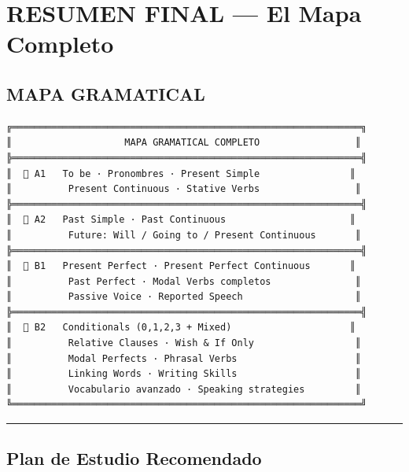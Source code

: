 \documentclass[
  spanish,
  letterpaper,
]{scrbook}
\begin{document}

\chapter{RESUMEN FINAL --- El Mapa
Completo}\label{resumen-final-el-mapa-completo}

\section{MAPA GRAMATICAL}\label{mapa-gramatical}

\begin{verbatim}
╔══════════════════════════════════════════════════════════════╗
║                    MAPA GRAMATICAL COMPLETO                 ║
╠══════════════════════════════════════════════════════════════╣
║  📘 A1   To be · Pronombres · Present Simple                ║
║          Present Continuous · Stative Verbs                 ║
╠══════════════════════════════════════════════════════════════╣
║  📗 A2   Past Simple · Past Continuous                      ║
║          Future: Will / Going to / Present Continuous       ║
╠══════════════════════════════════════════════════════════════╣
║  📙 B1   Present Perfect · Present Perfect Continuous       ║
║          Past Perfect · Modal Verbs completos               ║
║          Passive Voice · Reported Speech                    ║
╠══════════════════════════════════════════════════════════════╣
║  📕 B2   Conditionals (0,1,2,3 + Mixed)                     ║
║          Relative Clauses · Wish & If Only                  ║
║          Modal Perfects · Phrasal Verbs                     ║
║          Linking Words · Writing Skills                     ║
║          Vocabulario avanzado · Speaking strategies         ║
╚══════════════════════════════════════════════════════════════╝
\end{verbatim}

\begin{center}\rule{0.5\linewidth}{0.5pt}\end{center}

\section{Plan de Estudio Recomendado}\label{plan-de-estudio-recomendado}
\end{document}
